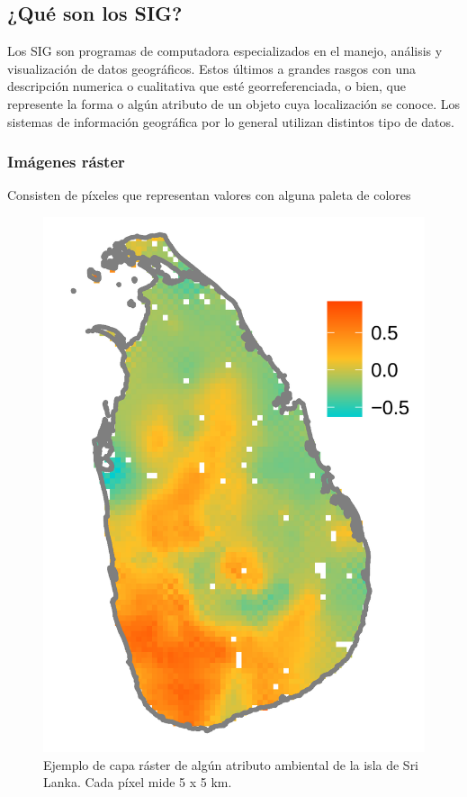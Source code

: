 \documentclass[
]{book}
\begin{document}
\hypertarget{quuxe9-son-los-sig}{%
\subsection{¿Qué son los SIG?}\label{quuxe9-son-los-sig}}

Los SIG son programas de computadora especializados en el manejo, análisis y visualización de datos geográficos. Estos últimos a grandes rasgos con una descripción numerica o cualitativa que esté georreferenciada, o bien, que represente la forma o algún atributo de un objeto cuya localización se conoce. Los sistemas de información geográfica por lo general utilizan distintos tipo de datos.

\hypertarget{imuxe1genes-ruxe1ster}{%
\subsubsection{Imágenes ráster}\label{imuxe1genes-ruxe1ster}}

Consisten de píxeles que representan valores con alguna paleta de colores

\begin{figure}

{\centering \includegraphics[width=13.57in]{Unidad-I/Rho-snakebites} 

}

\caption{Ejemplo de capa ráster de algún atributo ambiental de la isla de Sri Lanka. Cada píxel mide 5 x 5 km.}\label{fig:unnamed-chunk-5}
\end{figure}
\end{document}
